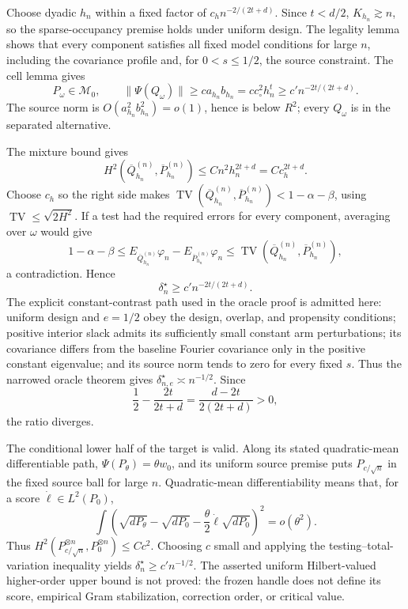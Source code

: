 Choose dyadic \(h_n\) within a fixed factor of \(c_hn^{-2/(2t+d)}\). Since \(t<d/2\), \(K_{h_n}\gtrsim n\), so the sparse-occupancy premise holds under uniform design. The legality lemma shows that every component satisfies all fixed model conditions for large \(n\), including the covariance profile and, for \(0<s\le1/2\), the source constraint. The cell lemma gives
\[
P_\omega\in\mathcal M_0,\qquad
\|\Psi(Q_\omega)\|
\ge ca_{h_n}b_{h_n}
=cc_\circ^2h_n^t
\ge c'n^{-2t/(2t+d)}. \tag{10}
\]
The source norm is \(O(a_{h_n}^2b_{h_n}^2)=o(1)\), hence is below \(R^2\); every \(Q_\omega\) is in the separated alternative.

The mixture bound gives
\[
H^2(\overline Q_{h_n}^{(n)},\overline P_{h_n}^{(n)})
\le Cn^2h_n^{2t+d}=Cc_h^{2t+d}. \tag{11}
\]
Choose \(c_h\) so the right side makes
\(\operatorname{TV}(\overline Q_{h_n}^{(n)},\overline P_{h_n}^{(n)})<1-\alpha-\beta\), using \(\operatorname{TV}\le\sqrt{2H^2}\). If a test had the required errors for every component, averaging over \(\omega\) would give
\[
1-\alpha-\beta
\le E_{\overline Q_{h_n}^{(n)}}\varphi_n
 -E_{\overline P_{h_n}^{(n)}}\varphi_n
\le\operatorname{TV}(\overline Q_{h_n}^{(n)},\overline P_{h_n}^{(n)}),
\]
a contradiction. Hence
\[
\delta_n^\star\ge c'n^{-2t/(2t+d)}.
\]
The explicit constant-contrast path used in the oracle proof is admitted here: uniform design and \(e=1/2\) obey the design, overlap, and propensity conditions; positive interior slack admits its sufficiently small constant arm perturbations; its covariance differs from the baseline Fourier covariance only in the positive constant eigenvalue; and its source norm tends to zero for every fixed \(s\). Thus the narrowed oracle theorem gives \(\delta_{n,e}^\star\asymp n^{-1/2}\). Since
\[
\frac12-\frac{2t}{2t+d}=\frac{d-2t}{2(2t+d)}>0,
\]
the ratio diverges.

The conditional lower half of the target is valid. Along its stated quadratic-mean differentiable path, \(\Psi(P_\theta)=\theta w_0\), and its uniform source premise puts \(P_{c/\sqrt n}\) in the fixed source ball for large \(n\). Quadratic-mean differentiability means that, for a score \(\dot\ell\in L^2(P_0)\),
\[
\int\left(\sqrt{dP_\theta}-\sqrt{dP_0}
-\frac{\theta}{2}\dot\ell\sqrt{dP_0}\right)^2=o(\theta^2).
\]
Thus \(H^2(P_{c/\sqrt n}^{\otimes n},P_0^{\otimes n})\le Cc^2\). Choosing \(c\) small and applying the testing--total-variation inequality yields \(\delta_n^\star\ge c'n^{-1/2}\). The asserted uniform Hilbert-valued higher-order upper bound is not proved: the frozen handle does not define its score, empirical Gram stabilization, correction order, or critical value.

